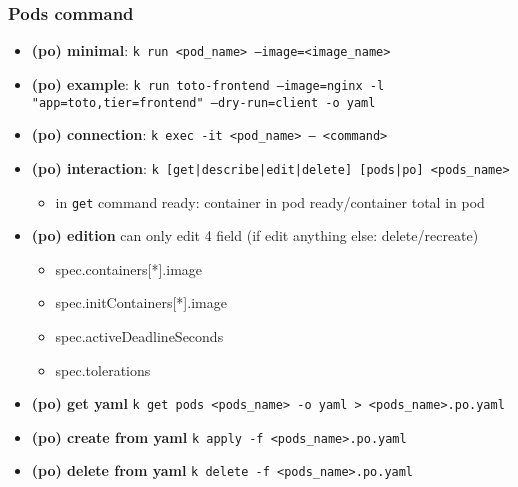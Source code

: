 \subsubsection{Pods command}
\begin{frame}[fragile]{\subsubsecname}
\begin{itemize}
  \item \textbf{(po) minimal}: \texttt{k run <pod\_name> --image=<image\_name>}
  \item \textbf{(po) example}: \texttt{k run toto-frontend --image=nginx -l "app=toto,tier=frontend" --dry-run=client -o yaml}
  \item \textbf{(po) connection}: \texttt{k exec -it <pod\_name> -- <command>}
  \item \textbf{(po) interaction}: \texttt{k [get|describe|edit|delete] [pods|po] <pods\_name>}
  \begin{itemize}
    \item in \texttt{get} command ready: container in pod ready/container total in pod
  \end{itemize}
  \item \textbf{(po) edition} can only edit 4 field (if edit anything else: delete/recreate)
  \begin{itemize}
    \item spec.containers[*].image
    \item spec.initContainers[*].image
    \item spec.activeDeadlineSeconds
    \item spec.tolerations
  \end{itemize}
  \item \textbf{(po) get yaml} \texttt{k get pods <pods\_name> -o yaml > <pods\_name>.po.yaml}
  \item \textbf{(po) create from yaml} \texttt{k apply -f <pods\_name>.po.yaml}
  \item \textbf{(po) delete from yaml} \texttt{k delete -f <pods\_name>.po.yaml}
\end{itemize}

\end{frame}
